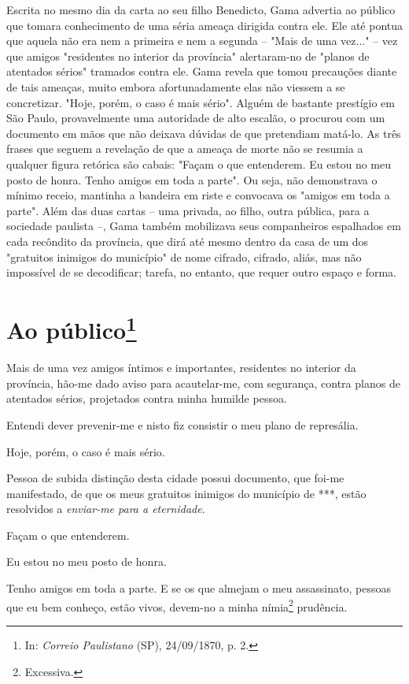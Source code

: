 {\small\noindent
Escrita no mesmo dia da carta ao seu filho Benedicto, Gama
advertia ao público que tomara conhecimento de uma séria ameaça dirigida
contra ele. Ele até pontua que aquela não era nem a primeira e nem a
segunda -- "Mais de uma vez..." -- vez que amigos "residentes no
interior da província" alertaram-no de "planos de atentados sérios"
tramados contra ele. Gama revela que tomou precauções diante de tais
ameaças, muito embora afortunadamente elas não viessem a se concretizar.
"Hoje, porém, o caso é mais sério". Alguém de bastante prestígio em São
Paulo, provavelmente uma autoridade de alto escalão, o procurou com um
documento em mãos que não deixava dúvidas de que pretendiam matá-lo. As
três frases que seguem a revelação de que a ameaça de morte não se
resumia a qualquer figura retórica são cabais: "Façam o que entenderem.
Eu estou no meu posto de honra. Tenho amigos em toda a parte". Ou seja,
não demonstrava o mínimo receio, mantinha a bandeira em riste e
convocava os "amigos em toda a parte". Além das duas cartas -- uma
privada, ao filho, outra pública, para a sociedade paulista --, Gama
também mobilizava seus companheiros espalhados em cada recôndito da
província, que dirá até mesmo dentro da casa de um dos "gratuitos
inimigos do município" de nome cifrado, cifrado, aliás, mas não
impossível de se decodificar; tarefa, no entanto, que requer outro
espaço e forma.}

\chapter{Ao público\footnote[*]{In: \emph{Correio Paulistano} (SP),
  24/09/1870, p. 2.}}

Mais de uma vez amigos íntimos e importantes, residentes no interior da
província, hão-me dado aviso para acautelar-me, com segurança, contra
planos de atentados sérios, projetados contra minha humilde pessoa.

Entendi dever prevenir-me e nisto fiz consistir o meu plano de
represália.

Hoje, porém, o caso é mais sério.

Pessoa de subida distinção desta cidade possui documento, que foi-me
manifestado, de que os meus gratuitos inimigos do município de ***,
estão resolvidos a \emph{enviar-me para a eternidade}.

Façam o que entenderem.

Eu estou no meu posto de honra.

Tenho amigos em toda a parte. E se os que almejam o meu assassinato,
pessoas que eu bem conheço, estão vivos, devem-no a minha
nímia\footnote{Excessiva.} prudência.

